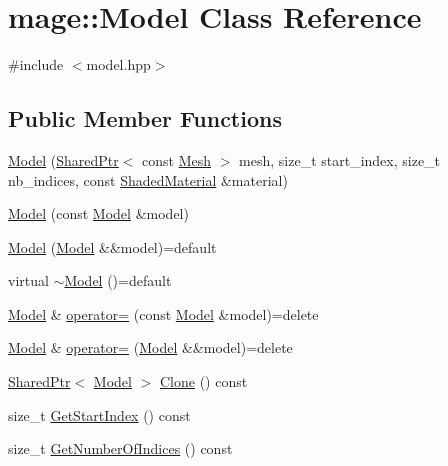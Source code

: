 \hypertarget{classmage_1_1_model}{}\section{mage\+:\+:Model Class Reference}
\label{classmage_1_1_model}


{\ttfamily \#include $<$model.\+hpp$>$}

\subsection*{Public Member Functions}
\begin{DoxyCompactItemize}
\item 
\hyperlink{classmage_1_1_model_aca2d5faa95a447ff3ecaab685aec8581}{Model} (\hyperlink{namespacemage_a1e01ae66713838a7a67d30e44c67703e}{Shared\+Ptr}$<$ const \hyperlink{classmage_1_1_mesh}{Mesh} $>$ mesh, size\+\_\+t start\+\_\+index, size\+\_\+t nb\+\_\+indices, const \hyperlink{structmage_1_1_shaded_material}{Shaded\+Material} \&material)
\item 
\hyperlink{classmage_1_1_model_ac5f1d340bbfefd30bec3e6343a86059a}{Model} (const \hyperlink{classmage_1_1_model}{Model} \&model)
\item 
\hyperlink{classmage_1_1_model_a085272d7cb82587094f18747ecc5aad0}{Model} (\hyperlink{classmage_1_1_model}{Model} \&\&model)=default
\item 
virtual \hyperlink{classmage_1_1_model_a802f7bcb3d15d3baab4a8d383d9e9293}{$\sim$\+Model} ()=default
\item 
\hyperlink{classmage_1_1_model}{Model} \& \hyperlink{classmage_1_1_model_a563515c64ec39cfcda9f6ca37576391b}{operator=} (const \hyperlink{classmage_1_1_model}{Model} \&model)=delete
\item 
\hyperlink{classmage_1_1_model}{Model} \& \hyperlink{classmage_1_1_model_a084e30d15822bfefa79128f30a57cc02}{operator=} (\hyperlink{classmage_1_1_model}{Model} \&\&model)=delete
\item 
\hyperlink{namespacemage_a1e01ae66713838a7a67d30e44c67703e}{Shared\+Ptr}$<$ \hyperlink{classmage_1_1_model}{Model} $>$ \hyperlink{classmage_1_1_model_ac0043eb1766f8a5be05284fbb9c3e912}{Clone} () const
\item 
size\+\_\+t \hyperlink{classmage_1_1_model_af17401dfd3e51f96dc0652a3aa3c4412}{Get\+Start\+Index} () const
\item 
size\+\_\+t \hyperlink{classmage_1_1_model_ac118db61c4541d16d9b1b52e55524956}{Get\+Number\+Of\+Indices} () const
\item 

\end{DoxyCompactItemize}
